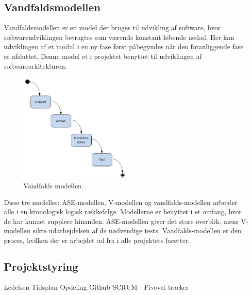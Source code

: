 \subsection{Vandfaldsmodellen}
Vandfaldsmodellen er en model der bruges til udvikling af software, hvor softwareudviklingen betragtes som værende konstant løbende nedad. Her kan udviklingen af et modul i en ny fase først påbegyndes når den foranliggende fase er afsluttet. Denne model et i projektet benyttet til udviklingen af softwarearkitekturen. 
\begin{figure}[H]
\includegraphics[width =0.5\textwidth , center]{billeder/Vandfald}
\caption{Vandfalds modellen.}
\end{figure} 
Disse tre modeller; ASE-modellen, V-modellen og vandfalds-modellen arbejder alle i en kronologisk logisk rækkefølge. Modellerne er benyttet i et omfang, hvor de har kunnet supplere hinanden. ASE-modellen giver det store overblik, mens V-modellen sikre udarbejdelsen af de nødvendige tests. Vandfalds-modellen er den proces, hvilken der er arbejdet ud fra i alle projektets facetter.   
\subsection{Projektstyring}
Ledelsen
Tidsplan
Opdeling
Github
SCRUM
- Pivoval tracker

